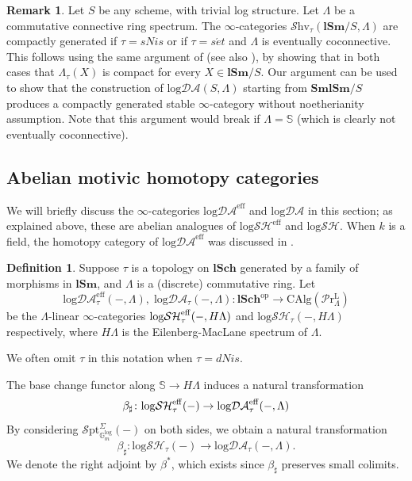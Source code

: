 \documentclass[11pt, a4paper]{amsart}
\theoremstyle{definition}
\newtheorem{df}[thm]{Definition}
\newtheorem{rmk}[thm]{Remark}
\numberwithin{equation}{subsection}
\newcommand{\lSch}{\mathbf{lSch}}
\newcommand{\lSm}{\mathbf{lSm}}
\newcommand{\SmlSm}{\mathbf{SmlSm}}
\newcommand{\Sphere}{\mathbb{S}}
\newcommand{\set}{{s\acute{e}t}}
\newcommand{\Gmm}{\mathbb{G}_m^{\mathrm{log}}}
\newcommand{\eff}{{\rm eff}}
\newcommand{\infShv}{\mathcal{S}\mathrm{hv}}
\newcommand{\infSpt}{\mathcal{S}\mathrm{pt}}
\newcommand{\LPr}{\mathcal{P}\mathrm{r}^{\mathrm{L}}}
\newcommand{\CAlg}{\mathrm{CAlg}}
\newcommand{\inflogSH}{\mathrm{log}\mathcal{SH}}
\newcommand{\inflogSHS}{\mathrm{log}\mathcal{SH}^{\mathrm{eff}}}
\newcommand{\inflogDA}{\mathrm{log}\mathcal{DA}}
\newcommand{\inflogDAeff}{\mathrm{log}\mathcal{DA}^{\mathrm{eff}}}
\begin{document}
\begin{rmk}Let $S$ be any scheme,  with trivial log structure. Let $\Lambda$ be a commutative connective ring spectrum. The $\infty$-categories
$\infShv_{\tau}(\lSm/S, \Lambda)$ are compactly generated  if $\tau=sNis$ or if $\tau=\set$ and $\Lambda$ is eventually coconnective. This follows using the same argument of \cite[Proposition 2.4.20]{AGV} (see also \cite[Remark 2.4.23]{AGV}), by showing that in both cases that $\Lambda_\tau(X)$ is compact for every $X\in \lSm/S$. Our argument can be used to show that the construction of $\inflogDA(S,\Lambda)$ starting from $\SmlSm/S$ produces a compactly generated stable $\infty$-category without noetherianity assumption. Note that this argument would break if $\Lambda = \Sphere$ (which is clearly not eventually coconnective).
\end{rmk} 
 


\subsection{Abelian motivic homotopy categories}

We will briefly discuss the $\infty$-categories  $\inflogDAeff$ and $\inflogDA$ in this section;  
as explained above, these are abelian analogues of $\inflogSHS$ and $\inflogSH$.
When $k$ is a field,
the homotopy category of $\inflogDAeff$ was discussed in \cite{logDM}.


\begin{df}
Suppose $\tau$ is a topology on $\lSch$ generated by a family of morphisms in $\lSm$, and $\Lambda$ is a (discrete) commutative ring.
Let\index[notation]{logDAeff @ $\inflogDAeff$}\index[notation]{logDA @ $\inflogDA$}
\[
\inflogDAeff_\tau(-,\Lambda),\;
\inflogDA_\tau(-,\Lambda)
\colon
\lSch^\mathrm{op}\to \CAlg(\LPr_{\Lambda})
\]
be the $\Lambda$-linear
$\infty$-categories $\inflogSH_\tau^\eff(-, H \Lambda)$ and  $\inflogSH_\tau(-, H \Lambda)$ respectively, where $H\Lambda$ is the Eilenberg-MacLane spectrum of $\Lambda$. 

We often omit $\tau$ in this notation when $\tau=dNis$.
\end{df}
The base change functor along $\Sphere\to H\Lambda$ induces a 
natural transformation
\begin{equation}
\label{logDA.3.2}
\beta_\sharp
\colon
\inflogSH_{\tau}^{\eff}(-)  
\to \inflogDAeff_\tau(-,\Lambda)
\end{equation}
By considering $\infSpt_{\Gmm}^\Sigma(-)$ on both sides, we obtain a
natural transformation
\begin{equation}
\label{logDA.3.3}
\beta_\sharp
\colon
\inflogSH_\tau(-)
\to
\inflogDA_\tau(-, \Lambda).
\end{equation}
We denote the right adjoint by $\beta^*$,
which exists since $\beta_\sharp$ preserves small colimits. 
\end{document}
